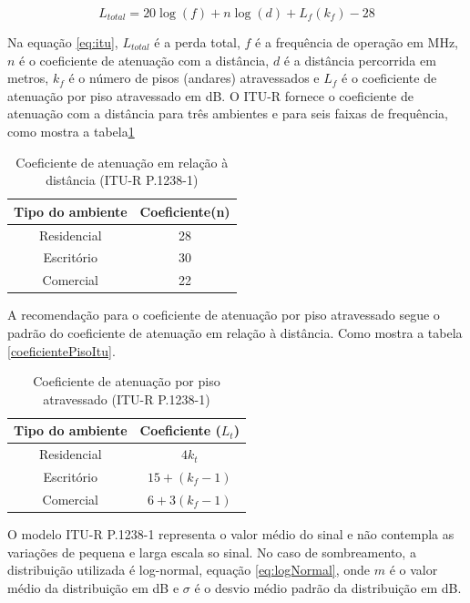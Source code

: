 \documentclass[tc,twoside]{iiufrgs}
\begin{document}
\begin{equation}
{L}_{total} = 20 \log(f) + n \log(d) + {L}_{f}({k}_{f}) - 28
\label{eq:itu}
\end{equation}

Na equação \ref{eq:itu}, $L_{total}$ é a perda total, $f$ é a frequência de operação em MHz, $n$ é o coeficiente de atenuação com a distância, $d$ é a distância percorrida em metros, $k_f$ é o número de pisos (andares) atravessados e $L_f$ é o coeficiente de atenuação por piso atravessado em dB. O ITU-R fornece o coeficiente de atenuação com a distância para três ambientes e para seis faixas de frequência, como mostra a tabela\ref{tbl:coeficienteDistanciaItu} \cite{najnudel2004estudo}

\begin{table}[ht]
\centering
\caption{Coeficiente de atenuação em relação à distância (ITU-R P.1238-1)}
\label{tbl:coeficienteDistanciaItu}
\begin{tabular}{cc}
\hline
\textbf{Tipo do ambiente} & \textbf{Coeficiente(n)} \\
\hline
Residencial & 28 \\
\hline
Escritório & 30 \\
\hline
Comercial & 22 \\
\hline
\end{tabular}
\end{table}

A recomendação para o coeficiente de atenuação por piso atravessado segue o padrão do coeficiente de atenuação em relação à distância. Como mostra a tabela \ref{coeficientePisoItu}. \cite{najnudel2004estudo}

\begin{table}[ht]
\centering
\caption{Coeficiente de atenuação por piso atravessado (ITU-R P.1238-1)}
\label{tbl:coeficientePisoItu}
\begin{tabular}{cc}
\hline
\textbf {Tipo do ambiente} & \textbf{Coeficiente ($L_t$)}\\ 
\hline
Residencial & $4 k_t$ \\
\hline
Escritório & $15 + (k_f - 1)$ \\
\hline
Comercial & $6 + 3 (k_f - 1)$\\
\hline
\end{tabular}
\end{table}

O modelo ITU-R P.1238-1 representa o valor médio do sinal e não contempla as variações de pequena e larga escala so sinal. No caso de sombreamento, a distribuição utilizada é log-normal, equação \ref{eq:logNormal}, onde $m$ é o valor médio da distribuição em dB e $\sigma$ é o desvio médio padrão da distribuição em dB. \cite{najnudel2004estudo} 
\end{document}
